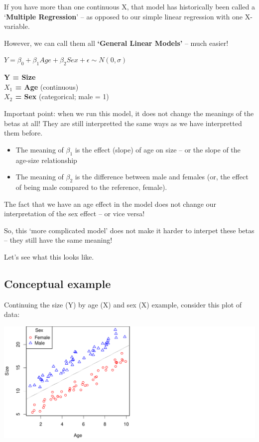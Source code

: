 \documentclass[
]{article}
\providecommand{\tightlist}{%
  \setlength{\itemsep}{0pt}\setlength{\parskip}{0pt}}
\begin{document}
If you have more than one continuous X, that model has historically been
called a `\textbf{Multiple Regression}' -- as opposed to our simple
linear regression with one X-variable.

However, we can call them all \textbf{`General Linear Models'} -- much
easier!

\textbf{\(Y = \beta_0 + \beta_1 Age + \beta_2 Sex + \epsilon \sim N(0, \sigma)\)}

\textbf{Y = Size}\\
\textbf{\(X_1\) = Age} (continuous)\\
\textbf{\(X_2\) = Sex} (categorical; male = 1)

Important point: when we run this model, it does not change the meanings
of the betas at all! They are still interpretted the same ways as we
have interpretted them before.

\begin{itemize}
\tightlist
\item
  The meaning of \(\beta_1\) is the effect (slope) of age on size -- or
  the slope of the age-size relationship
\item
  The meaning of \(\beta_2\) is the difference between male and females
  (or, the effect of being male compared to the reference, female).
\end{itemize}

The fact that we have an age effect in the model does not change our
interpretation of the sex effect -- or vice versa!

So, this `more complicated model' does not make it harder to interpet
these betas -- they still have the same meaning!

Let's see what this looks like.

\subsection{Conceptual example}\label{conceptual-example}

Continuing the size (Y) by age (X) and sex (X) example, consider this
plot of data:

\includegraphics{lecture_12_files/figure-latex/example1-1.pdf}
\end{document}
